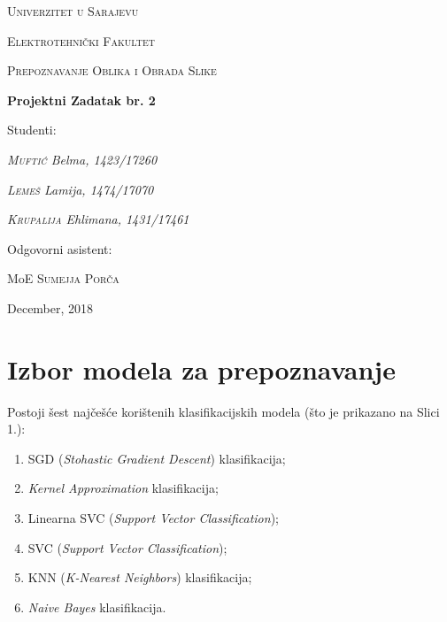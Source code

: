 \documentclass[12pt,a4paper]{article}
\begin{document}
\begin{titlepage}
	\centering
	{\scshape Univerzitet u Sarajevu \par}
	{\scshape Elektrotehnički Fakultet \par}
	\vspace{1cm}
	{\Large\scshape Prepoznavanje Oblika i Obrada Slike\par}
	\vspace{1.5cm}
	{\huge\bfseries Projektni Zadatak br. 2\par}
	\vspace{2cm}
	\Large Studenti: \par
	{\Large\itshape \textsc{Muftić} Belma, 1423/17260\par}
	{\Large\itshape \textsc{Lemeš} Lamija, 1474/17070\par}
	{\Large\itshape \textsc{Krupalija} Ehlimana, 1431/17461\par}
	\vfill
	Odgovorni asistent:\par
	MoE \textsc{Sumejja Porča}
	\vfill
	{\large December, 2018\par}
\end{titlepage}


\tableofcontents

\newpage

\setcounter{page}{1}

\section{Izbor modela za prepoznavanje}

Postoji šest najčešće korištenih klasifikacijskih modela (što je prikazano na Slici 1.):

\begin{enumerate}

\item SGD (\textit{Stohastic Gradient Descent}) klasifikacija;
\item \textit{Kernel Approximation} klasifikacija;
\item Linearna SVC (\textit{Support Vector Classification});
\item SVC (\textit{Support Vector Classification});
\item KNN (\textit{K-Nearest Neighbors}) klasifikacija;
\item \textit{Naive Bayes} klasifikacija.

\end{enumerate}
\end{document}
